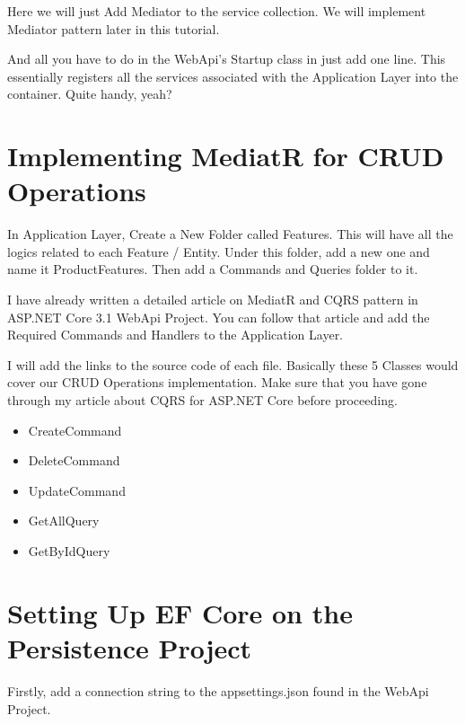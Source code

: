 \documentclass[letterpaper,10pt,english]{sphinxmanual}
\begin{document}
Here we will just Add Mediator to the service collection. We will implement Mediator pattern later in this tutorial.

And all you have to do in the WebApi’s Startup class in just add one line. This essentially registers all the services associated with the Application Layer into the container. Quite handy, yeah?

\begin{sphinxVerbatim}[commandchars=\\\{\}]
\end{sphinxVerbatim}


\section{Implementing MediatR for CRUD Operations}
\label{\detokenize{OnionArchitecture/details:implementing-mediatr-for-crud-operations}}
In Application Layer, Create a New Folder called Features. This will have all the logics related to each Feature / Entity. Under this folder, add a new one and name it ProductFeatures. Then add a Commands and Queries folder to it.

I have already written a detailed article on MediatR and CQRS pattern in ASP.NET Core 3.1 WebApi Project. You can follow that article and add the Required Commands and Handlers to the Application Layer.

\noindent{}

I will add the links to the source code of each file. Basically these 5 Classes would cover our CRUD Operations implementation. Make sure that you have gone through my article about CQRS for ASP.NET Core before proceeding.
\begin{itemize}
\item {} 
CreateCommand

\item {} 
DeleteCommand

\item {} 
UpdateCommand

\item {} 
GetAllQuery

\item {} 
GetByIdQuery

\end{itemize}


\section{Setting Up EF Core on the Persistence Project}
\label{\detokenize{OnionArchitecture/details:setting-up-ef-core-on-the-persistence-project}}
Firstly, add a connection string to the appsettings.json found in the WebApi Project.
\end{document}
